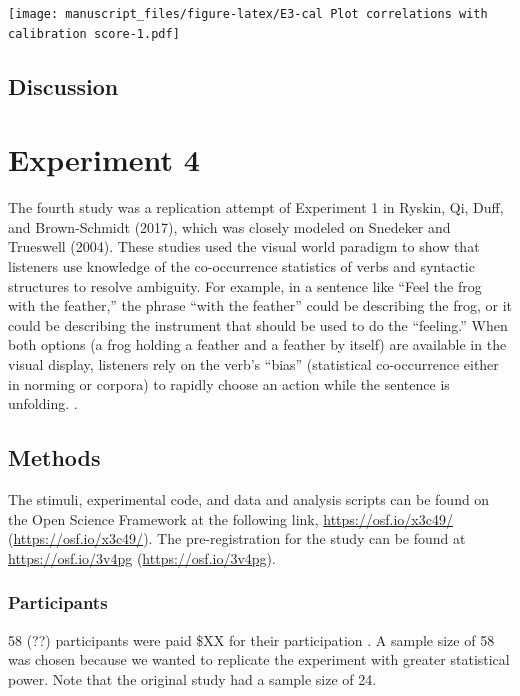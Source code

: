 \documentclass[
  man,floatsintext]{apa6}
\begin{document}
\texttt{[image: manuscript\_files/figure-latex/E3-cal Plot correlations with calibration score-1.pdf]}

\hypertarget{discussion-2}{%
\subsection{Discussion}\label{discussion-2}}

\hypertarget{experiment-4}{%
\section{Experiment 4}\label{experiment-4}}

The fourth study was a replication attempt of Experiment 1 in
Ryskin, Qi, Duff, and Brown-Schmidt (2017), which was closely modeled on
Snedeker and Trueswell (2004). These studies used the
visual world paradigm to show that listeners use knowledge of the
co-occurrence statistics of verbs and syntactic structures to resolve
ambiguity. For example, in a sentence like ``Feel the frog with the
feather,'' the phrase ``with the feather'' could be describing the frog, or
it could be describing the instrument that should be used to do the
``feeling.'' When both options (a frog holding a feather and a feather by
itself) are available in the visual display, listeners rely on the
verb's ``bias'' (statistical co-occurrence either in norming or corpora)
to rapidly choose an action while the sentence is unfolding. .

\hypertarget{methods-3}{%
\subsection{Methods}\label{methods-3}}

The stimuli, experimental code, and data and analysis scripts can be
found on the Open Science Framework at the following link,
\url{https://osf.io/x3c49/} (\url{https://osf.io/x3c49/}). The pre-registration
for the study can be found at \url{https://osf.io/3v4pg}
(\url{https://osf.io/3v4pg}).

\hypertarget{participants-4}{%
\subsubsection{Participants}\label{participants-4}}

58 (??) participants were paid \$XX for their participation
. A sample size of 58 was chosen because we wanted to
replicate the experiment with greater statistical power. Note that the
original study had a sample size of 24.
\end{document}
